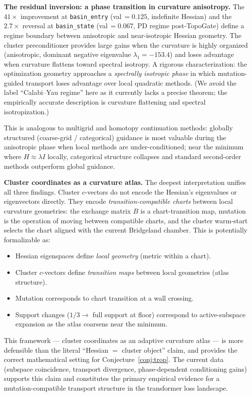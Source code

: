 \documentclass[11pt]{amsart}
\begin{document}
\textbf{The residual inversion: a phase transition in curvature anisotropy.}
The $41\times$ improvement at \texttt{basin\_entry} (val\,$=0.125$,
indefinite Hessian) and the $2.7\times$ reversal at
\texttt{basin\_state} (val\,$=0.067$, PD regime post-TopoGate)
define a regime boundary between anisotropic and near-isotropic
Hessian geometry.
The cluster preconditioner provides large gains when the curvature is
highly organized (anisotropic, dominant negative eigenvalue
$\lambda_1 = -153.4$) and loses advantage when curvature flattens
toward spectral isotropy.
A rigorous characterization: the optimization geometry approaches a
\emph{spectrally isotropic phase} in which mutation-guided transport
loses advantage over local quadratic methods.
(We avoid the label ``Calabi--Yau regime'' here as it currently lacks
a precise theorem; the empirically accurate description is
curvature flattening and spectral isotropization.)

This is analogous to multigrid and homotopy continuation methods:
globally structured (coarse-grid / categorical) guidance is most
valuable during the anisotropic phase when local methods are
under-conditioned; near the minimum where $H \approx \lambda I$ locally,
categorical structure collapses and standard second-order methods
outperform global guidance.

\textbf{Cluster coordinates as a curvature atlas.}
The deepest interpretation unifies all three findings.
Cluster $c$-vectors do not encode the Hessian's eigenvalues or
eigenvectors directly.
They encode \emph{transition-compatible charts} between local
curvature geometries: the exchange matrix $B$ is a chart-transition
map, mutation is the operation of moving between compatible charts,
and the cluster warm-start selects the chart aligned with the current
Bridgeland chamber.
This is potentially formalizable as:
\begin{itemize}
\item Hessian eigenspaces define \emph{local geometry} (metric within
  a chart).
\item Cluster $c$-vectors define \emph{transition maps} between local
  geometries (atlas structure).
\item Mutation corresponds to chart transition at a wall crossing.
\item Support changes ($1/3 \to$ full support at floor) correspond to
  active-subspace expansion as the atlas coarsens near the minimum.
\end{itemize}
This framework --- cluster coordinates as an adaptive curvature atlas
--- is more defensible than the literal ``Hessian $=$ cluster object''
claim, and provides the correct mathematical setting for
Conjecture~\ref{conj:trop}.
The current data (subspace coincidence, transport divergence,
phase-dependent conditioning gains) supports this claim
and constitutes the primary empirical evidence for a mutation-compatible
transport structure in the transformer loss landscape.
\end{document}
